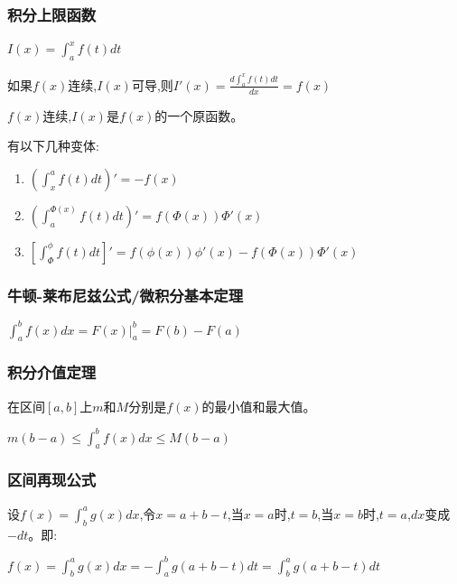\documentclass[UTF8]{ctexbook}
\newcommand{\defFunction}[1]{f(#1)}
\newcommand{\definiteIntegral}[2]{\int^{#1}_{#2}}
\begin{document}
{{{\subsubsection{积分上限函数}{
  $I(x) = \definiteIntegral{x}{a}\defFunction{t}dt$

  如果$\defFunction{x}连续$,$I(x)$可导,则$I\prime(x) = \frac{d\definiteIntegral{x}{a}f(t)dt}{dx} = f(x)$

  $\defFunction{x}$连续,$I(x)$是$f(x)$的一个原函数。

  有以下几种变体:

  \begin{enumerate}
    \item $(\definiteIntegral{a}{x}\defFunction{t}dt)\prime = -\defFunction{x}$
    \item $(\definiteIntegral{\Phi(x)}{a}\defFunction{t}dt)\prime = \defFunction{\Phi(x)}\Phi\prime(x)$
    \item $[\definiteIntegral{\phi}{\Phi}\defFunction{t}dt]\prime = \defFunction{\phi(x)}\phi\prime(x) - \defFunction{\Phi(x)}\Phi\prime(x)$
  \end{enumerate}

}%

\subsubsection{牛顿-莱布尼兹公式/微积分基本定理}{
  $\definiteIntegral{b}{a}\defFunction{x}dx = F(x)|^b_a = F(b) - F(a)$
}%

\subsubsection{积分介值定理}{

  在区间$[a,b]$上$m$和$M$分别是$\defFunction{x}$的最小值和最大值。

  $m(b - a) \leq \definiteIntegral{b}{a}\defFunction{x}dx \leq M(b - a)$

}%

\subsubsection{区间再现公式}{
  设$\defFunction{x} = \definiteIntegral{a}{b}g(x)dx$,令$x = a + b - t$,当$x = a$时,$t = b$,当$x = b$时,$t = a$,$dx$变成$-dt$。即:

  $\defFunction{x} = \definiteIntegral{a}{b}g(x)dx = -\definiteIntegral{b}{a}g(a+b-t)dt = \definiteIntegral{a}{b}g(a + b - t)dt$

}}}}
\end{document}
